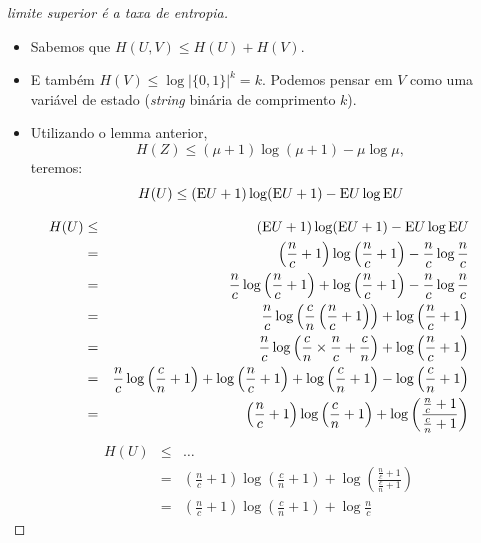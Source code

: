 \begin{frame}[allowframebreaks]
\begin{proof}[limite superior é a taxa de entropia]
  \begin{itemize}
  \item Sabemos que $H(U,V) \leq H(U) + H(V)$.
  \item E também $H(V) \leq \log \vert \{0,1\} \vert^k = k$. Podemos pensar em $V$ como uma variável de estado
	(\textit{string} binária de comprimento $k$).
  \end{itemize}
  \proofbreak
  \begin{itemize}
  \item Utilizando o lemma anterior, 
        \begin{equation}
        H(Z) \leq (\mu + 1) \log (\mu + 1) - \mu \log \mu ,
        \end{equation}	
	teremos:
	\begin{equation}
	H(U) \leq (\mathrm{E} U + 1) \log (\mathrm{E} U + 1) - \mathrm{E} U \log \mathrm{E} U
	\end{equation}
  \end{itemize}

  \proofbreak
  \vspace{-1em}
  \begin{eqnarray}
  H(U) &\leq& (\mathrm{E} U + 1) \log (\mathrm{E} U + 1) - \mathrm{E} U \log \mathrm{E} U \nonumber \\
	&=& \left( \frac{n}{c} + 1 \right) \log \left( \frac{n}{c} + 1 \right) - \frac{n}{c} \log \frac{n}{c} \nonumber \\
	&=& \frac{n}{c} \log \left( \frac{n}{c} + 1 \right) + \log \left( \frac{n}{c} + 1 \right) - \frac{n}{c} \log \frac{n}{c} \nonumber \\
	&=& \frac{n}{c} \log \left( \frac{c}{n} \left( \frac{n}{c} + 1 \right) \right) + \log \left( \frac{n}{c} + 1 \right) \nonumber \\
	&=& \frac{n}{c} \log \left( \frac{c}{n} \times \frac{n}{c} + \frac{c}{n} \right) + \log \left( \frac{n}{c} + 1 \right) \nonumber \\
	&=& \frac{n}{c} \log \left( \frac{c}{n} + 1 \right) + \log \left( \frac{n}{c} + 1 \right) + \log \left( \frac{c}{n} + 1 \right) - \log \left( \frac{c}{n} + 1 \right) \nonumber \\
	&=& \left( \frac{n}{c} + 1 \right) \log \left( \frac{c}{n} + 1 \right) + \log \left( \frac{\frac{n}{c} + 1}{\frac{c}{n} + 1} \right) 
  \end{eqnarray}
  \proofbreak
  \begin{eqnarray}
  H(U) &\leq& \ldots \nonumber \\
	&=& \left( \frac{n}{c} + 1 \right) \log \left( \frac{c}{n} + 1 \right) + \log \left( \frac{\frac{n}{c} + 1}{\frac{c}{n} + 1} \right) \nonumber \\
	&=& \left( \frac{n}{c} + 1 \right) \log \left( \frac{c}{n} + 1 \right) + \log \frac{n}{c}
  \end{eqnarray}


\end{proof}
\end{frame}
